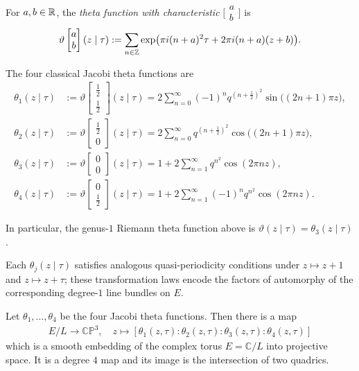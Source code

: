 \documentclass[12pt]{article}
\begin{document}
\begin{definition}
For $a,b\in\mathbb{R}$, the \emph{theta function with characteristic}
$\bigl[\begin{smallmatrix}a\\ b\end{smallmatrix}\bigr]$ is
\[
\vartheta\begin{bmatrix}a\\ b\end{bmatrix}(z\mid\tau)
:= \sum_{n\in\mathbb{Z}}
   \exp\bigl(\pi i (n+a)^2\tau
              + 2\pi i (n+a)(z+b)\bigr).
\]

The four classical Jacobi theta functions are
\begin{align*}
\theta_1(z\mid\tau)
&:= \vartheta\!\begin{bmatrix}\tfrac12\\ \tfrac12\end{bmatrix}(z\mid\tau)
 = 2 \sum_{n=0}^\infty
   (-1)^n q^{(n+\tfrac12)^2}
   \sin\bigl((2n+1)\pi z\bigr),\\[0.3em]
\theta_2(z\mid\tau)
&:= \vartheta\!\begin{bmatrix}\tfrac12\\ 0\end{bmatrix}(z\mid\tau)
 = 2 \sum_{n=0}^\infty
   q^{(n+\tfrac12)^2}
   \cos\bigl((2n+1)\pi z\bigr),\\[0.3em]
\theta_3(z\mid\tau)
&:= \vartheta\!\begin{bmatrix}0\\ 0\end{bmatrix}(z\mid\tau)
 = 1 + 2\sum_{n=1}^\infty q^{n^2}\cos(2\pi n z),\\[0.3em]
\theta_4(z\mid\tau)
&:= \vartheta\!\begin{bmatrix}0\\ \tfrac12\end{bmatrix}(z\mid\tau)
 = 1 + 2\sum_{n=1}^\infty (-1)^n q^{n^2}\cos(2\pi n z).
\end{align*}

In particular, the genus-$1$ Riemann theta function above is
$\vartheta(z\mid\tau)=\theta_3(z\mid\tau)$.
\end{definition}

Each $\theta_j(z\mid\tau)$ satisfies analogous quasi-periodicity
conditions under $z\mapsto z+1$ and $z\mapsto z+\tau$; these
transformation laws encode the factors of automorphy of the corresponding
degree-$1$ line bundles on $E$.

\begin{theorem}
    Let $\theta_1,\dots,\theta_4$ be the four Jacobi theta functions. Then there is a map \begin{align*}
        E/L \to \mathbb{CP}^3, \quad z \mapsto [\theta_1(z,\tau):\theta_2(z,\tau):\theta_3(z,\tau):\theta_4(z,\tau)]
    \end{align*} which is a smooth embedding of the complex torus $E=\mathbb{C}/L$ into projective space. It is a degree $4$ map and its image is the intersection of two quadrics.
\end{theorem}
\end{document}
